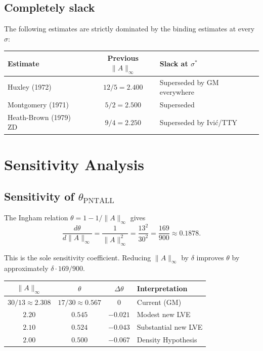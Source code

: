 \documentclass[11pt,a4paper]{article}
\begin{document}
\subsection*{Completely slack}

The following estimates are strictly dominated by the binding estimates at every $\sigma$:

\begin{center}
\begin{tabular}{lcl}
\toprule
Estimate & Previous $\|A\|_{\infty}$ & Slack at $\sigma^{*}$ \\
\midrule
Huxley (1972)~\cite{Hux72}        & $12/5 = 2.400$ & Superseded by GM everywhere \\
Montgomery (1971)~\cite{Mon71}    & $5/2 = 2.500$  & Superseded \\
Heath-Brown (1979) ZD~\cite{HB79zd} & $9/4 = 2.250$ & Superseded by Ivi\'c/TTY \\
\bottomrule
\end{tabular}
\end{center}

\section{Sensitivity Analysis}

\subsection*{Sensitivity of $\theta_{\mathrm{PNTALL}}$}

The Ingham relation $\theta = 1 - 1/\|A\|_{\infty}$ gives
\[
  \frac{d\theta}{d\|A\|_{\infty}}
  = \frac{1}{\|A\|_{\infty}^{2}}
  = \frac{13^{2}}{30^{2}} = \frac{169}{900} \approx 0.1878.
\]

This is the sole sensitivity coefficient.  Reducing $\|A\|_{\infty}$ by $\delta$ improves $\theta$ by approximately $\delta \cdot 169/900$.

\begin{center}
\begin{tabular}{cccl}
\toprule
$\|A\|_{\infty}$ & $\theta$ & $\Delta\theta$ & Interpretation \\
\midrule
$30/13 \approx 2.308$ & $17/30 \approx 0.567$ & $0$       & Current (GM) \\
$2.20$                & $0.545$               & $-0.021$  & Modest new LVE \\
$2.10$                & $0.524$               & $-0.043$  & Substantial new LVE \\
$2.00$                & $0.500$               & $-0.067$  & Density Hypothesis \\
\bottomrule
\end{tabular}
\end{center}
\end{document}
